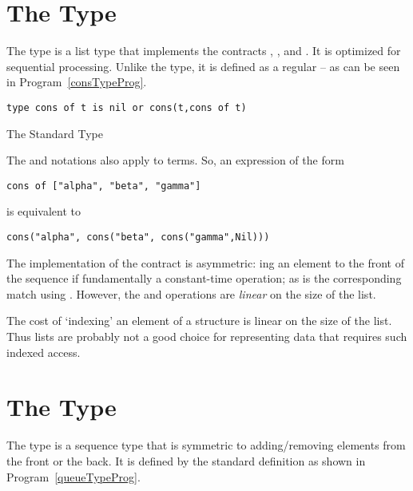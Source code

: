 \section{The  Type}
\label{consType}
The  type is a list type that implements the contracts , ,  and . It is optimized for sequential processing. Unlike the  type, it is defined as a regular  -- as can be seen in Program~\vref{consTypeProg}.

\begin{program}[H]
\begin{lstlisting}
type cons of t is nil or cons(t,cons of t)
\end{lstlisting}
\caption{The Standard  Type}\label{consTypeProg}
\end{program}

The  and  notations also apply to  terms. So, an expression of the form
\begin{lstlisting}
cons of ["alpha", "beta", "gamma"]
\end{lstlisting}
is equivalent to 
\begin{lstlisting}
cons("alpha", cons("beta", cons("gamma",Nil)))
\end{lstlisting}

\begin{aside}
The  implementation of the  contract is asymmetric: ing an element to the front of the  sequence if fundamentally a constant-time operation; as is the corresponding match using . However, the  and  operations are \emph{linear} on the size of the  list.
\end{aside}

\begin{aside}
The cost of `indexing' an element of a  structure is linear on the size of the  list. Thus  lists are probably not a good choice for representing data that requires such indexed access.
\end{aside}

\section{The  Type}
\label{queueType}
The  type is a sequence type that is symmetric to adding/removing elements from the front or the back. It is defined by the standard definition as shown in Program~\vref{queueTypeProg}.

